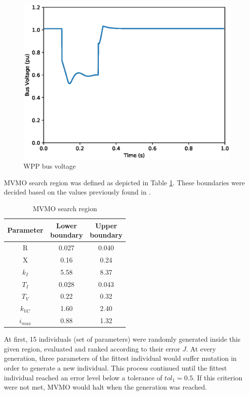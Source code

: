 \begin{figure}[!h]
	\centering
	\includegraphics[scale=.7]{Images/bus_voltage.eps}
	\caption{WPP bus voltage}
	\label{fig: WPP_voltage}
\end{figure}

MVMO search region was defined as depicted in Table \ref{tab: MVMO_boundaries}. These boundaries were decided based on the values previously found in \cite{Cari2015}.

\begin{table}[!h]
	\centering
	\begin{tabular}{c|cc}
		Parameter & \shortstack{Lower \\ boundary} & \shortstack{Upper \\ boundary} \\\hline
		R & 0.027 & 0.040 \\
		X & 0.16 & 0.24 \\
		$k_{I}$ & 5.58 & 8.37 \\
		$T_{I}$ & 0.028 & 0.043 \\
		$T_{V}$ & 0.22 & 0.32 \\
		$k_{VC}$ & 1.60 & 2.40 \\
		$i_{max}$ & 0.88 & 1.32
	\end{tabular}
	\caption{MVMO search region}
	\label{tab: MVMO_boundaries}
\end{table}

At first, 15 individuals (set of parameters) were randomly generated inside this given region, evaluated and ranked according to their error $J$. At every generation, three parameters of the fittest individual would suffer mutation in order to generate a new individual. This process continued until the fittest individual reached an error level below a tolerance of $tol_{1} = 0.5$. If this criterion were not met, MVMO would halt when the  generation was reached.

